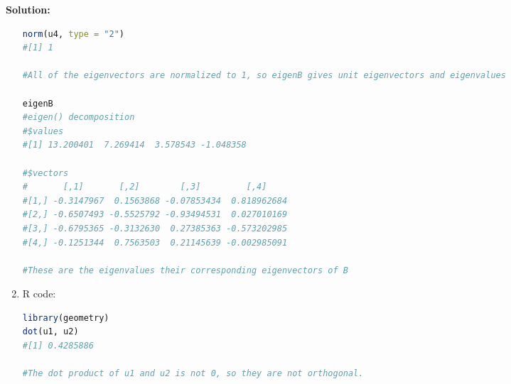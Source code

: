 \documentclass[12pt]{article}
\newenvironment{solution}{
    \textbf{Solution:}
    
}{
    
    \vspace{2em}
}
\begin{document}
\begin{solution}
\begin{enumerate}[label=\alph*)]
\begin{lstlisting}[language=R]
norm(u4, type = "2")
#[1] 1

#All of the eigenvectors are normalized to 1, so eigenB gives unit eigenvectors and eigenvalues

eigenB
#eigen() decomposition
#$values
#[1] 13.200401  7.269414  3.578543 -1.048358

#$vectors
#       [,1]       [,2]        [,3]         [,4]
#[1,] -0.3147967  0.1563868 -0.07853434  0.818962684
#[2,] -0.6507493 -0.5525792 -0.93494531  0.027010169
#[3,] -0.6795365 -0.3132630  0.27385363 -0.573202985
#[4,] -0.1251344  0.7563503  0.21145639 -0.002985091

#These are the eigenvalues their corresponding eigenvectors of B
        \end{lstlisting}
        \item R code:
        \begin{lstlisting}[language=R]
library(geometry)
dot(u1, u2)
#[1] 0.4285886

#The dot product of u1 and u2 is not 0, so they are not orthogonal.
        \end{lstlisting}

    \end{enumerate}
\end{solution}
\end{document}
